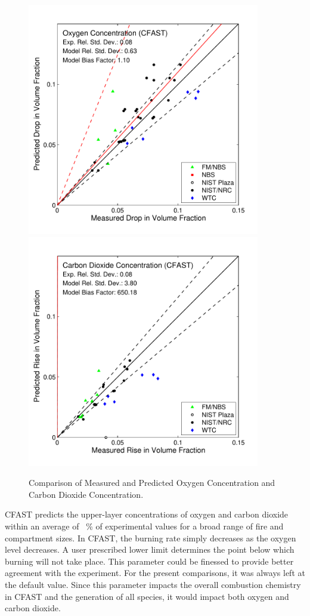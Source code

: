 \begin{figure}
\begin{center}
\includegraphics[width=4.0in]{FIGURES/ScatterPlots/Oxygen_Concentration}  \\
\includegraphics[width=4.0in]{FIGURES/ScatterPlots/Carbon_Dioxide_Concentration}  \\
\end{center}
\caption{Comparison of Measured and Predicted Oxygen Concentration and Carbon Dioxide Concentration.} \label{fig:Species_Scatter}
\end{figure}

CFAST predicts the upper-layer concentrations of oxygen and carbon dioxide within an average of \Speciesavg~\% of experimental values for a broad range of fire and compartment sizes.  In CFAST, the burning rate simply decreases as the oxygen level decreases.  A user prescribed lower limit determines the point below which burning will not take place.  This parameter could be finessed to provide better agreement with the experiment.  For the present comparisons, it was always left at the default value. Since this parameter impacts the overall combustion chemistry in CFAST and the generation of all species, it would impact both oxygen and carbon dioxide.

